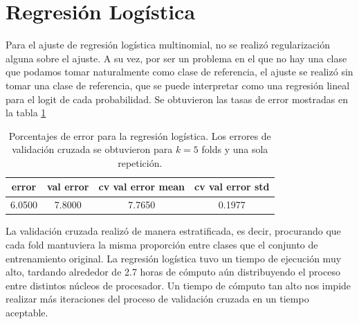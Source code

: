 \documentclass[11pt]{article}
\begin{document}
\section{Regresión Logística}
Para el ajuste de regresión logística multinomial, no se realizó regularización alguna sobre el ajuste. A su vez, por ser un problema en el que no hay una clase que podamos tomar naturalmente como clase de referencia, el ajuste se realizó sin tomar una clase de referencia, que se puede interpretar como una regresión lineal para el logit de cada probabilidad. Se obtuvieron las tasas de error mostradas en la tabla \ref{tab:logreg}
\begin{table}[H]
    \centering
    \begin{tabular}{c|c|c|c}
        \toprule
        error & val error & cv val error mean & cv val error std \\
        \midrule
        6.0500 &  7.8000 & 7.7650 & 0.1977  \\
        \bottomrule
    \end{tabular}
    \caption{Porcentajes de error para la regresión logística. Los errores de validación cruzada se obtuvieron para $k=5$ folds y una sola repetición.}
    \label{tab:logreg}
\end{table}
La validación cruzada realizó de manera estratificada, es decir, procurando que cada fold mantuviera la misma proporción entre clases que el conjunto de entrenamiento original. La regresión logística tuvo un tiempo de ejecución muy alto, tardando alrededor de 2.7 horas de cómputo aún distribuyendo el proceso entre distintos núcleos de procesador. Un tiempo de cómputo tan alto nos impide realizar más iteraciones del proceso de validación cruzada en un tiempo aceptable.
\end{document}
